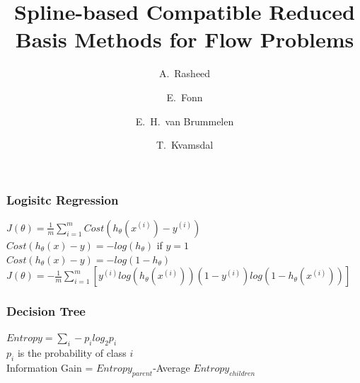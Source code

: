 \documentclass{beamer}
\begin{document}
\title[Reduced Basis Methods]{
  Spline-based Compatible Reduced Basis Methods for Flow Problems
}
\author[A. Rasheed]{
  A.~Rasheed \and
  E.~Fonn \and
  E.~H.~van Brummelen \and
  T.~Kvamsdal
}
\date[Hybrid Analytics]{}



 \begin{frame}
   \titlepage
 \end{frame}

\begin{frame}
\frametitle{Logisitc Regression}
$J(\theta)=\frac{1}{m}\sum\limits_{i=1}^{m}Cost(h_{\theta}(x^{(i)})-y^{(i)})$\\

$Cost(h_{\theta}(x)-y)=-log(h_{\theta})$ if $y=1$\\

$Cost(h_{\theta}(x)-y)=-log(1-h_{\theta})$ \\

$J(\theta)=-\frac{1}{m}\sum\limits_{i=1}^{m}[y^{(i)}log(h_{\theta}(x^{(i)}))  (1-y^{(i)})log(1-h_{\theta}(x^{(i)}))]$
\end{frame}

\begin{frame}
	\frametitle{Decision Tree}
	$Entropy=\sum\limits_{i}-p_{i}log_{2}p_{i}$ \\
	$p_{i}$ is the probability of class $i$ \\ \vspace{0.5cm} 
	Information Gain = $Entropy_{parent}$-Average $Entropy_{children}$
\end{frame}
\end{document}
